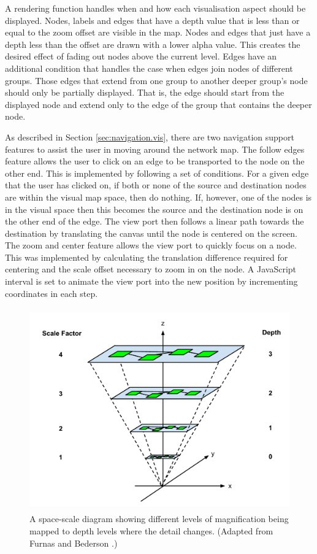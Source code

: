 \documentclass[11pt, a4paper]{article}
\begin{document}
A rendering function handles when and how each visualisation aspect should be
displayed. Nodes, labels and edges that have a depth value that is less than or
equal to the zoom offset are visible in the map. Nodes and edges that just have
a depth less than the offset are drawn with a lower alpha value. This creates
the desired effect of fading out nodes above the current level. Edges have an
additional condition that handles the case when edges join nodes of different
groups. Those edges that extend from one group to another deeper group's node
should only be partially displayed. That is, the edge should start from the
displayed node and extend only to the edge of the group that contains the deeper
node.

As described in Section \ref{sec:navigation.vis}, there are two navigation
support features to assist the user in moving around the network map. The follow
edges feature allows the user to click on an edge to be transported to the node
on the other end. This is implemented by following a set of conditions. For a
given edge that the user has clicked on, if both or none of the source and
destination nodes are within the visual map space, then do nothing. If, however,
one of the nodes is in the visual space then this becomes the source and the
destination node is on the other end of the edge. The view port then follows a
linear path towards the destination by translating the canvas until the node is
centered on the screen. The zoom and center feature allows the view port to
quickly focus on a node. This was implemented by calculating the translation
difference required for centering and the scale offset necessary to zoom in on
the node. A JavaScript interval is set to animate the view port into the new
position by incrementing coordinates in each step.

\begin{figure} \centering
\includegraphics[width=120mm,height=87.2mm]{assets/nav2-0.pdf}
\caption{A space-scale diagram showing different levels of magnification being
mapped to depth levels where the detail changes. (Adapted from Furnas and
Bederson \cite{Furnas_1995}.) } 
\label{fig:nav2.0} 
\end{figure}
\end{document}

